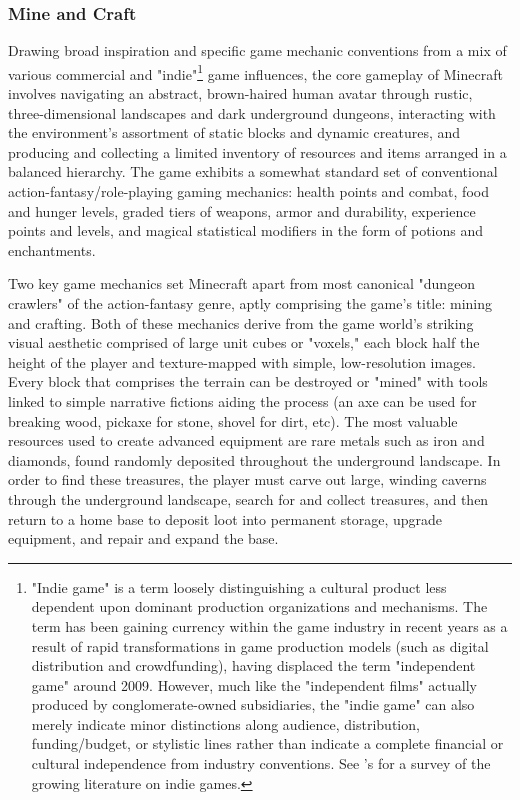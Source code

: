 \subsubsection*{Mine and Craft}
Drawing broad inspiration and specific game mechanic conventions from a mix of various commercial and "indie"\footnote{
  "Indie game" is a term loosely distinguishing a cultural product less dependent upon dominant production organizations and mechanisms. The term has been gaining currency within the game industry in recent years as a result of rapid transformations in game production models (such as digital distribution and crowdfunding), having displaced the term "independent game" around 2009. However, much like the "independent films" actually produced by conglomerate-owned subsidiaries, the "indie game" can also merely indicate minor distinctions along audience, distribution, funding/budget, or stylistic lines rather than indicate a complete financial or cultural independence from industry conventions. See \citeauthor{Parker2013}'s  for a survey of the growing literature on indie games.
}
game influences, the core gameplay of Minecraft involves navigating an abstract, brown-haired human avatar through rustic, three-dimensional landscapes and dark underground dungeons, interacting with the environment's assortment of static blocks and dynamic creatures, and producing and collecting a limited inventory of resources and items arranged in a balanced hierarchy. The game exhibits a somewhat standard set of conventional action-fantasy/role-playing gaming mechanics: health points and combat, food and hunger levels, graded tiers of weapons, armor and durability, experience points and levels, and magical statistical modifiers in the form of potions and enchantments.

Two key game mechanics set Minecraft apart from most canonical "dungeon crawlers" of the action-fantasy genre, aptly comprising the game's title: mining and crafting. Both of these mechanics derive from the game world's striking visual aesthetic comprised of large unit cubes or "voxels," each block half the height of the player and texture-mapped with simple, low-resolution images. Every block that comprises the terrain can be destroyed or "mined" with tools linked to simple narrative fictions aiding the process (an axe can be used for breaking wood, pickaxe for stone, shovel for dirt, etc). The most valuable resources used to create advanced equipment are rare metals such as iron and diamonds, found randomly deposited throughout the underground landscape. In order to find these treasures, the player must carve out large, winding caverns through the underground landscape, search for and collect treasures, and then return to a home base to deposit loot into permanent storage, upgrade equipment, and repair and expand the base.

